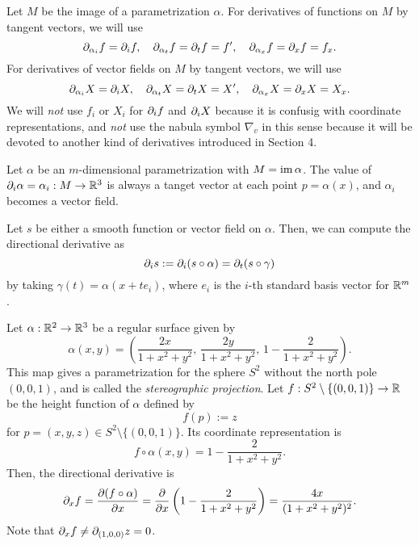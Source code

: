 \documentclass{../note}
\def\a{\alpha}
\begin{document}
\begin{notn*}
Let $M$ be the image of a parametrization $\a$.
For derivatives of functions on $M$ by tangent vectors, we will use
\[\pd_{\a_i}f=\pd_if,\quad\pd_{\a_t}f=\pd_tf=f',\quad\pd_{\a_x}f=\pd_xf=f_x.\]
For derivatives of vector fields on $M$ by tangent vectors, we will use
\[\pd_{\a_i}X=\pd_iX,\quad\pd_{\a_t}X=\pd_tX=X',\quad\pd_{\a_x}X=\pd_xX=X_x.\]
We will \emph{not} use $f_i$ or $X_i$ for $\pd_if$ and $\pd_iX$ because it is confusig with coordinate representations, and \emph{not} use the nabula symbol $\nabla_v$ in this sense because it will be devoted to another kind of derivatives introduced in Section 4.
\end{notn*}

\begin{ex} %
\begin{parts}
\item
Let $\a$ be an $m$-dimensional parametrization with $M=\im\a$.
The value of $\pd_i\a=\a_i:M\to\R^3$ is always a tanget vector at each point $p=\a(x)$, and $\a_i$ becomes a vector field.

Let $s$ be either a smooth function or vector field on $\a$.
Then, we can compute the directional derivative as
\[\pd_is:=\pd_i(s\circ\a)=\pd_t(s\circ\gamma)\]
by taking $\gamma(t)=\a(x+te_i)$, where $e_i$ is the $i$-th standard basis vector for $\mathbb{R}^m$.

\item
Let $\a:\R^2\to\R^3$ be a regular surface given by
\[\a(x,y)=\left(\frac{2x}{1+x^2+y^2},\,\frac{2y}{1+x^2+y^2},\,1-\frac2{1+x^2+y^2}\right).\]
This map gives a parametrization for the sphere $S^2$ without the north pole $(0,0,1)$, and is called the \emph{stereographic projection}.
Let $f:S^2\setminus\{(0,0,1)\}\to\mathbb{R}$ be the height function of $\a$ defined by
\[f(p):=z\]
for $p=(x,y,z)\in S^2\setminus\{(0,0,1)\}$.
Its coordinate representation is
\[f\circ\a(x,y)=1-\frac2{1+x^2+y^2}.\]
Then, the directional derivative is
\[\pd_xf=\pd{(f\circ\a)}{x}=\pd{x}\left(1-\frac2{1+x^2+y^2}\right)=\frac{4x}{(1+x^2+y^2)^2}.\]
Note that $\pd_xf\ne\pd_{(1,0,0)}z=0$.
\end{parts}
\end{ex}



\end{document}
